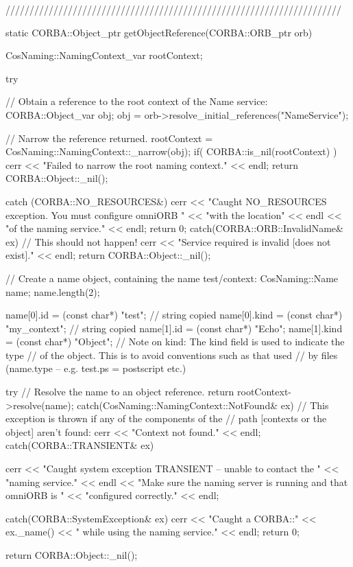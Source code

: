 \documentclass[11pt,twoside,a4paper]{book}
\begin{document}
\begin{cxxlisting}
//////////////////////////////////////////////////////////////////////

static CORBA::Object_ptr
getObjectReference(CORBA::ORB_ptr orb)
{
  CosNaming::NamingContext_var rootContext;
  
  try {
    // Obtain a reference to the root context of the Name service:
    CORBA::Object_var obj;
    obj = orb->resolve_initial_references("NameService");

    // Narrow the reference returned.
    rootContext = CosNaming::NamingContext::_narrow(obj);
    if( CORBA::is_nil(rootContext) ) {
      cerr << "Failed to narrow the root naming context." << endl;
      return CORBA::Object::_nil();
    }
  }
  catch (CORBA::NO_RESOURCES&) {
    cerr << "Caught NO_RESOURCES exception. You must configure omniORB "
	 << "with the location" << endl
	 << "of the naming service." << endl;
    return 0;
  }
  catch(CORBA::ORB::InvalidName& ex) {
    // This should not happen!
    cerr << "Service required is invalid [does not exist]." << endl;
    return CORBA::Object::_nil();
  }

  // Create a name object, containing the name test/context:
  CosNaming::Name name;
  name.length(2);

  name[0].id   = (const char*) "test";       // string copied
  name[0].kind = (const char*) "my_context"; // string copied
  name[1].id   = (const char*) "Echo";
  name[1].kind = (const char*) "Object";
  // Note on kind: The kind field is used to indicate the type
  // of the object. This is to avoid conventions such as that used
  // by files (name.type -- e.g. test.ps = postscript etc.)

  try {
    // Resolve the name to an object reference.
    return rootContext->resolve(name);
  }
  catch(CosNaming::NamingContext::NotFound& ex) {
    // This exception is thrown if any of the components of the
    // path [contexts or the object] aren't found:
    cerr << "Context not found." << endl;
  }
  catch(CORBA::TRANSIENT& ex) {
    cerr << "Caught system exception TRANSIENT -- unable to contact the "
         << "naming service." << endl
	 << "Make sure the naming server is running and that omniORB is "
	 << "configured correctly." << endl;

  }
  catch(CORBA::SystemException& ex) {
    cerr << "Caught a CORBA::" << ex._name()
	 << " while using the naming service." << endl;
    return 0;
  }

  return CORBA::Object::_nil();
}
\end{cxxlisting}
\end{document}
